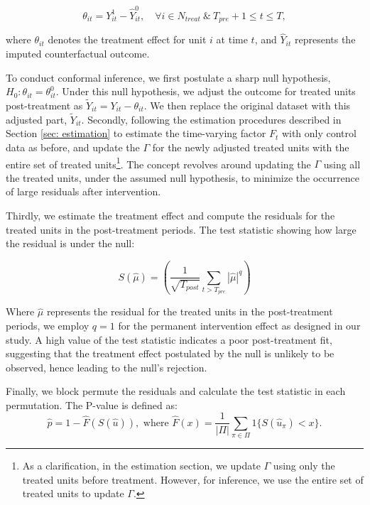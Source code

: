 \documentclass[12pt]{article}
\begin{document}
\begin{equation*}
\theta_{it} = Y^1_{it} - \hat{Y}^0_{it}, \quad \forall i \in N_{treat} \ \& \ T_{pre} + 1 \leq t \leq T,
\end{equation*}

\noindent where $\theta_{it}$ denotes the treatment effect for unit $i$ at time $t$, and $\hat{Y}_{it}$ represents the imputed counterfactual outcome. 
    
To conduct conformal inference, we first postulate a sharp null hypothesis, $H_0: \theta_{it} = \theta_{it}^0$. Under this null hypothesis, we adjust the outcome for treated units post-treatment as $\tilde{Y}_{it} = Y_{it} - \theta_{it}$. We then replace the original dataset with this adjusted part, $\tilde{Y}_{it}$. Secondly, following the estimation procedures described in Section \ref{sec: estimation} to estimate the time-varying factor $F_t$ with only control data as before, and update the $\Gamma$ for the newly adjusted treated units with the entire set of treated units\footnote{As a clarification, in the estimation section, we update $\Gamma$ using only the treated units before treatment. However, for inference, we use the entire set of treated units to update 
$\Gamma$.}. The concept revolves around updating the $\Gamma$ using all the treated units, under the assumed null hypothesis, to minimize the occurrence of large residuals after intervention.

Thirdly, we estimate the treatment effect and compute the residuals for the treated units in the post-treatment periods. The test statistic showing how large the residual is under the null:

\begin{equation}
S(\hat{\mu}) = \left(\frac{1}{\sqrt{T_{post}}}\sum_{t > T_{pre}} |\hat{\mu}|^q \right)
\end{equation}

Where $\hat{\mu}$ represents the residual for the treated units in the post-treatment periods, we employ $q=1$ for the permanent intervention effect as designed in our study. A high value of the test statistic indicates a poor post-treatment fit, suggesting that the treatment effect postulated by the null is unlikely to be observed, hence leading to the null's rejection. 

Finally, we block permute the residuals and calculate the test statistic in each permutation. The P-value is defined as:
\begin{equation}
\hat{p} = 1 - \hat{F}(S(\hat{u})), \text{ where } \hat{F}(x) = \frac{1}{|\Pi|} \sum_{\pi \in \Pi} 1\{S(\hat{u}_\pi) < x\}.
\end{equation}
\end{document}
